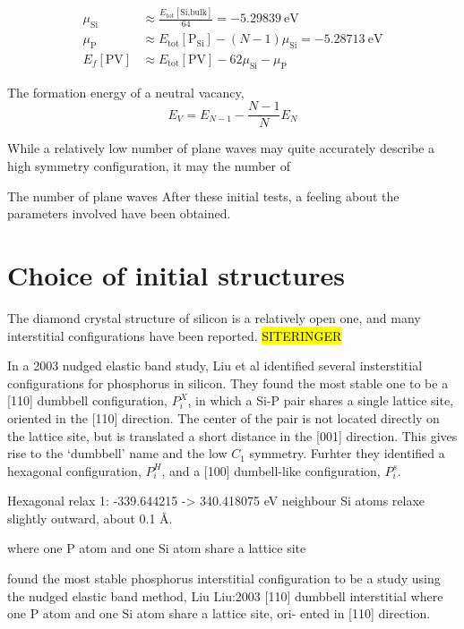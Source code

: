 \documentclass[11pt]{scrbook}   %
\newcommand{\comment}[1]{\hl{#1}}
\begin{document}
\begin{align}
  \mu_{\text{Si}} &\approx \frac{E_{\text{tot}}[\text{Si,bulk}]}{64} = \SI{-5.29839}{\electronvolt} \\
  \mu_{\text{P}} &\approx E_{\text{tot}}[\text{P}_{\text{Si}}] - (N-1)\mu_{\text{Si}}
  = \SI{-5.28713}{\electronvolt}\\
  E_f[\text{PV}] &\approx E_{\text{tot}}[\text{PV}] - 62\mu_{\text{Si}} - \mu_{\text{P}}
\end{align}

The formation energy of a neutral vacancy,
\begin{equation}
  E_V = E_{N-1} - \frac{N-1}{N} E_N 
\end{equation}


While a relatively low number of plane waves 
may quite accurately describe a high symmetry configuration, it may 
the number of 

The number of plane waves 
After these initial tests, a feeling about the parameters involved have been obtained. 





\section{Choice of initial structures}\label{seq:initial-structures}

The diamond crystal structure of silicon is a relatively open one, and many interstitial configurations have been reported.
\comment{SITERINGER}

In a 2003 nudged elastic band study, Liu et al identified several insterstitial configurations for phosphorus in silicon.
They found the most stable one to be a [110] dumbbell configuration, $P_i^X$, in which a Si-P pair shares a single lattice site, oriented in the [110] direction. The center of the pair is not located directly on the lattice site, but is translated a short distance in the [001] direction. This gives rise to the `dumbbell' name and the low $C_1$ symmetry.
Furhter they identified a hexagonal configuration, $P_i^H$, and a [100] dumbell-like configuration, $P_i^s$.



Hexagonal relax 1: -339.644215 -> 340.418075 eV
neighbour Si atoms relaxe slightly outward, about 0.1 Å.

where one P atom and one Si atom share a lattice site

found the most stable phosphorus interstitial configuration to be a
 study using the nudged elastic band method, Liu 
Liu:2003
[110] dumbbell interstitial where one P atom and one Si atom share a lattice site, ori- ented in [110] direction.
\end{document}
